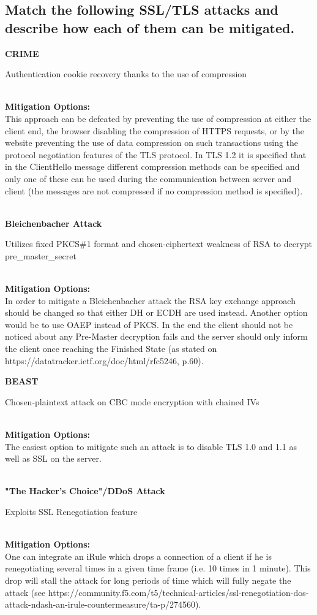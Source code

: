 \documentclass{report}
\begin{document}
		\subsection{Match the following SSL/TLS attacks and describe how each of them can be mitigated.}
		\startsubsection
			\parbox{6.5cm}{\textbf{CRIME}\dotfill} \parbox[t]{8cm}{Authentication cookie recovery thanks to the use of compression} \\
			\textbf{Mitigation Options:} \\
			This approach can be defeated by preventing the use of compression at either the client end, the browser disabling the compression of HTTPS requests, or by the website preventing the use of data compression on such transactions using the protocol negotiation features of the TLS protocol. In TLS 1.2 it is specified that in the ClientHello message different compression methods can be specified and only one of these can be used during the communication between server and client (the messages are not compressed if no compression method is specified).\\
			\\\parbox{6.5cm}{\textbf{Bleichenbacher Attack}\dotfill} \parbox[t]{8cm}{Utilizes fixed PKCS\#1 format and chosen-ciphertext weakness of RSA to decrypt pre\_master\_secret} \\
			\textbf{Mitigation Options:} \\
			In order to mitigate a Bleichenbacher attack the RSA key exchange approach should be changed so that either DH or ECDH are used instead. Another option would be to use OAEP instead of PKCS. In the end the client should not be noticed about any Pre-Master decryption fails and the server should only inform the client once reaching the Finished State (as stated on https://datatracker.ietf.org/doc/html/rfc5246, p.60). \\
			\newpage\noindent\parbox{6.5cm}{\textbf{BEAST}\dotfill} \parbox[t]{8cm}{Chosen-plaintext attack on CBC mode encryption with chained IVs} \\
			\textbf{Mitigation Options:} \\
			The easiest option to mitigate such an attack is to disable TLS 1.0 and 1.1 as well as SSL on the server. \\
			\\\parbox{6.5cm}{\textbf{"The Hacker's Choice"/DDoS Attack}\dotfill} \parbox[t]{8cm}{Exploits SSL Renegotiation feature} \\
			\textbf{Mitigation Options:} \\
			One can integrate an iRule which drops a connection of a client if he is renegotiating several times in a given time frame (i.e. 10 times in 1 minute). This drop will stall the attack for long periods of time which will fully negate the attack (see https://community.f5.com/t5/technical-articles/ssl-renegotiation-dos-attack-ndash-an-irule-countermeasure/ta-p/274560).
		\closesection
	\closesection
\end{document}
